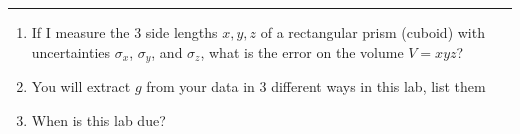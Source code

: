 \documentclass[11pt]{article}
\begin{document}
\Large

\medskip\hrule\bigskip\bigskip
{}
\begin{enumerate}

\item If I measure the 3 side lengths $x,y,z$ of a rectangular prism (cuboid) with uncertainties $\sigma_x$, $\sigma_y$, and $\sigma_z$, what is the error on the volume $V=xyz$?
  \vspace*{0.27\textheight}
\item You will extract $g$ from your data in 3 different ways in this lab, list them
  \vspace*{0.27\textheight}
\item When is this lab due?
  
\end{enumerate}
\end{document}
